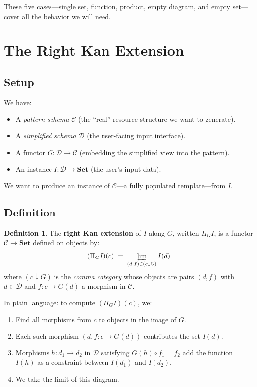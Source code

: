 \documentclass[11pt,a4paper]{article}
\theoremstyle{definition}
\newtheorem{definition}{Definition}[section]
\theoremstyle{plain}
\newcommand{\Set}{\mathbf{Set}}
\begin{document}
These five cases---single set, function, product, empty diagram, and empty set---cover all the behavior we will need.

\section{The Right Kan Extension}

\subsection{Setup}

We have:
\begin{itemize}
  \item A \emph{pattern schema} $\mathcal{C}$ (the ``real'' resource structure we want to generate).
  \item A \emph{simplified schema} $\mathcal{D}$ (the user-facing input interface).
  \item A functor $G \colon \mathcal{D} \to \mathcal{C}$ (embedding the simplified view into the pattern).
  \item An instance $I \colon \mathcal{D} \to \Set$ (the user's input data).
\end{itemize}

We want to produce an instance of $\mathcal{C}$---a fully populated template---from $I$.

\subsection{Definition}

\begin{definition}
The \textbf{right Kan extension} of $I$ along $G$, written $\Pi_G I$, is a functor $\mathcal{C} \to \Set$ defined on objects by:
\[
(\Pi_G I)(c) \;=\; \varprojlim_{(d, f) \in (c \downarrow G)} I(d)
\]
where $(c \downarrow G)$ is the \emph{comma category} whose objects are pairs $(d, f)$ with $d \in \mathcal{D}$ and $f \colon c \to G(d)$ a morphism in $\mathcal{C}$.
\end{definition}

In plain language: to compute $(\Pi_G I)(c)$, we:
\begin{enumerate}
  \item Find all morphisms from $c$ to objects in the image of $G$.
  \item Each such morphism $(d, f \colon c \to G(d))$ contributes the set $I(d)$.
  \item Morphisms $h \colon d_1 \to d_2$ in $\mathcal{D}$ satisfying $G(h) \circ f_1 = f_2$ add the function $I(h)$ as a constraint between $I(d_1)$ and $I(d_2)$.
  \item We take the limit of this diagram.
\end{enumerate}
\end{document}
